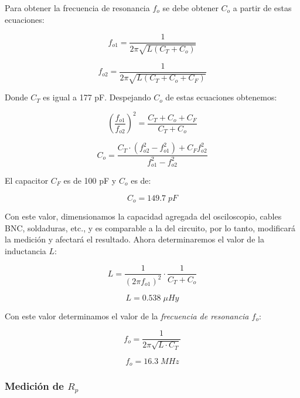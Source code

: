 Para obtener la frecuencia de resonancia $f_o$ se debe obtener $C_o$ a partir de estas ecuaciones:

\begin{equation}
    f_{o1} = \frac{1}{2\pi\sqrt{L(C_T + C_o)}}
\end{equation}

\begin{equation}
    f_{o2} = \frac{1}{2\pi\sqrt{L(C_T + C_o + C_F)}}
\end{equation}

Donde $C_T$ es igual a 177 pF. Despejando $C_o$ de estas ecuaciones obtenemos:

\begin{equation}
    \left(\frac{f_{o1}}{f_{o2}}\right)^2 = \frac{C_T + C_o + C_F}{C_T + C_o}
\end{equation}

\begin{equation}
    C_o = \frac{C_T \cdot (f_{o2}^2 - f_{o1}^2) + C_F f_{o2}^2}{f_{o1}^2 - f_{o2}^2}
\end{equation}

El capacitor $C_F$ es de 100 pF y $C_o$ es de:

\begin{equation}
    \boxed{C_o = 149.7\; pF}
\end{equation}

Con este valor, dimensionamos la capacidad agregada del osciloscopio, cables BNC, soldaduras, etc., y es comparable a la del 
circuito, por lo tanto, modificará la medición y afectará el resultado. Ahora determinaremos el valor de la inductancia $L$:

\begin{equation}
    L = \frac{1}{(2\pi f_{o1})^2} \cdot \frac{1}{C_T + C_o}
\end{equation}

\begin{equation}
    \boxed{L = 0.538\; \mu Hy}
\end{equation}

Con este valor determinamos el valor de la \textit{frecuencia de resonancia $f_o$}:

\begin{equation}
    f_o = \frac{1}{2\pi\sqrt{L \cdot C_T}}
\end{equation}

\begin{equation}
    \boxed{f_o = 16.3\; MHz}
\end{equation}


\subsubsection{Medición de $R_p$}

